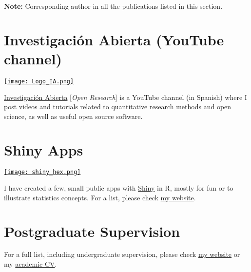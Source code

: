 \documentclass[11pt,a4paper,]{awesome-cv}
\begin{document}
\endgroup

\begin{footnotesize}
\textbf{Note:} Corresponding author in all the publications listed in this section.
\end{footnotesize}

\section{Investigación Abierta (YouTube
channel)}\label{investigaciuxf3n-abierta-youtube-channel}

\begin{minipage}[c]{0.15\linewidth}
\href{https://www.youtube.com/@InvestigacionAbierta}{\texttt{[image: Logo\_IA.png]}}
\end{minipage} \begin{minipage}[c]{0.85\linewidth}
\textcolor{red}{\faYoutube} \href{https://www.youtube.com/@InvestigacionAbierta}{Investigación Abierta} [\textit{Open Research}] is a YouTube channel (in Spanish) where I post videos and tutorials related to quantitative research methods and open science, as well as useful open source software.
\end{minipage}

\section{Shiny Apps}\label{shiny-apps}

\begin{minipage}[c]{0.10\linewidth}
\href{https://jdleongomez.info/en/#shiny}{\texttt{[image: shiny\_hex.png]}}
\end{minipage} \begin{minipage}[c]{0.90\linewidth}
I have created a few, small public apps with \href{https://shiny.posit.co/}{Shiny} in R, mostly for fun or to illustrate statistics concepts. For a list, please check \href{https://jdleongomez.info/en/#shiny}{my website}.
\end{minipage}

\section{Postgraduate Supervision}\label{postgraduate-supervision}

For a full list, including undergraduate supervision, please check
\href{https://jdleongomez.info/en/team/}{my website} or my
\href{https://jdleongomez.info/en/files/jdl_cv_en.pdf}{academic CV}.
\end{document}
